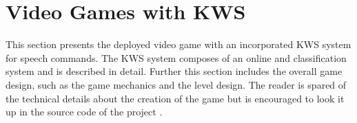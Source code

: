 
\chapter{Video Games with KWS}\label{sec:game}
This section presents the deployed video game with an incorporated KWS system for speech commands.
The KWS system composes of an online and classification system and is described in detail.
Further this section includes the overall game design, such as the game mechanics and the level design.
The reader is spared of the technical details about the creation of the game but is encouraged to look it up in the source code of the project \cite{KWSGame}.



